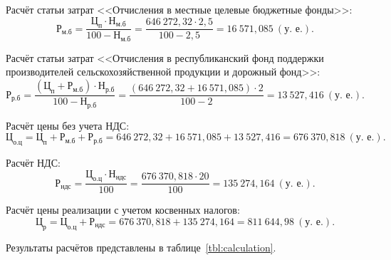 Расчёт статьи затрат
<<Отчисления в местные целевые бюджетные фонды>>:
\begin{equation*}
\text{Р}_{\text{м.б}} =
\dfrac{
  \text{Ц}_{\text{п}} \cdot \text{Н}_{\text{м.б}}
}{
  100 - \text{Н}_{\text{м.б}}
} =
\dfrac{646~272{,}32 \cdot 2{,}5 }{100 - 2{,}5} = 16~571{,}085 ~ (\text{у.~е.}).
\end{equation*}

Расчёт статьи затрат
<<Отчисления в республиканский фонд поддержки производителей
сельскохозяйственной продукции и дорожный фонд>>:
\begin{equation*}
\text{Р}_{\text{р.б}} =
\dfrac{
  (\text{Ц}_{\text{п}} + \text{Р}_{\text{м.б}}) \cdot \text{Н}_{\text{р.б}}
}{
  100 - \text{Н}_{\text{р.б}}
} =
\dfrac{(646~272{,}32 + 16~571{,}085) \cdot 2}{100 - 2} = 13~527{,}416 ~ (\text{у.~е.}).
\end{equation*}

Расчёт цены без учета НДС:
\begin{equation*}
\text{Ц}_{\text{о.ц}} =
\text{Ц}_{\text{п}} + \text{Р}_{\text{м.б}} + \text{Р}_{\text{р.б}} =
646~272{,}32 + 16~571{,}085 + 13~527{,}416 = 676~370{,}818~(\text{у.~е.}).
\end{equation*}

Расчёт НДС:
\begin{equation*}
\text{Р}_{\text{ндс}} =
\dfrac{
  \text{Ц}_{\text{о.ц}} \cdot \text{Н}_{\text{ндс}}
}{
  100
} =
\dfrac{676~370{,}818 \cdot 20}{100} = 135~274{,}164 \: (\text{у.~е.}).
\end{equation*}

Расчёт цены реализации с учетом косвенных налогов:
\begin{equation*}
\text{Ц}_{\text{р}} =
\text{Ц}_{\text{о.ц}} + \text{Р}_{\text{ндс}} =
676~370{,}818 + 135~274{,}164 = 811~644{,}98 ~ (\text{у.~е.}).
\end{equation*}

Результаты расчётов представлены в таблице~\ref{tbl:calculation}.

